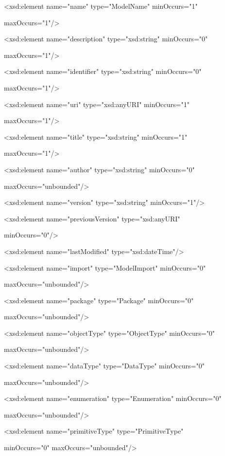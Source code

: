 \documentclass[10pt,a4paper]{ivoa}
\begin{document}
\textless xsd:element name="name" type="ModelName" minOccurs="1"

maxOccurs="1"/\textgreater{}

\textless xsd:element name="description" type="xsd:string" minOccurs="0"

maxOccurs="1"/\textgreater{}

\textless xsd:element name="identifier" type="xsd:string" minOccurs="0"

maxOccurs="1"/\textgreater{}

\textless xsd:element name="uri" type="xsd:anyURI" minOccurs="1"

maxOccurs="1"/\textgreater{}

\textless xsd:element name="title" type="xsd:string" minOccurs="1"

maxOccurs="1"/\textgreater{}

\textless xsd:element name="author" type="xsd:string" minOccurs="0"

maxOccurs="unbounded"/\textgreater{}

\textless xsd:element name="version" type="xsd:string"
minOccurs="1"/\textgreater{}

\textless xsd:element name="previousVersion" type="xsd:anyURI"

minOccurs="0"/\textgreater{}

\textless xsd:element name="lastModified"
type="xsd:dateTime"/\textgreater{}

\textless xsd:element name="import" type="ModelImport" minOccurs="0"

maxOccurs="unbounded"/\textgreater{}

\textless xsd:element name="package" type="Package" minOccurs="0"

maxOccurs="unbounded"/\textgreater{}

\textless xsd:element name="objectType" type="ObjectType" minOccurs="0"

maxOccurs="unbounded"/\textgreater{}

\textless xsd:element name="dataType" type="DataType" minOccurs="0"

maxOccurs="unbounded"/\textgreater{}

\textless xsd:element name="enumeration" type="Enumeration"
minOccurs="0"

maxOccurs="unbounded"/\textgreater{}

\textless xsd:element name="primitiveType" type="PrimitiveType"

minOccurs="0" maxOccurs="unbounded"/\textgreater{}
\end{document}
